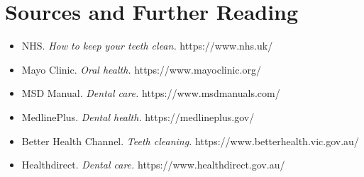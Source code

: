 \section*{Sources and Further Reading}
\begin{itemize}
    \item NHS. \textit{How to keep your teeth clean.} https://www.nhs.uk/
    \item Mayo Clinic. \textit{Oral health.} https://www.mayoclinic.org/
    \item MSD Manual. \textit{Dental care.} https://www.msdmanuals.com/
    \item MedlinePlus. \textit{Dental health.} https://medlineplus.gov/
    \item Better Health Channel. \textit{Teeth cleaning.} https://www.betterhealth.vic.gov.au/
    \item Healthdirect. \textit{Dental care.} https://www.healthdirect.gov.au/
\end{itemize}
